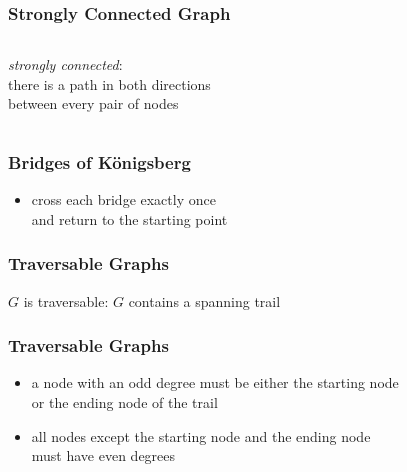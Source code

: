 \documentclass[dvipsnames]{beamer}
\begin{document}
\begin{frame}
  \frametitle{Strongly Connected Graph}

  \begin{columns}
    \begin{definition}
      \emph{strongly connected}:\\
      there is a path in both directions\\
      between every pair of nodes
    \end{definition}

    \begin{example}
      \begin{center}
      \end{center}
    \end{example}
  \end{columns}
\end{frame}

\begin{frame}
  \frametitle{Bridges of Königsberg}

  \begin{center}
  \end{center}

  \begin{itemize}
    \item cross each bridge exactly once\\
      and return to the starting point
  \end{itemize}
\end{frame}

\begin{frame}
  \frametitle{Traversable Graphs}

  \begin{definition}
    $G$ is \alert{traversable}: $G$ contains a spanning trail
  \end{definition}

  \begin{center}
  \end{center}
\end{frame}

\begin{frame}
  \frametitle{Traversable Graphs}

  \begin{itemize}
    \item a node with an odd degree must be either the starting node\\
      or the ending node of the trail
    \item all nodes except the starting node and the ending node\\
      must have even degrees
  \end{itemize}
\end{frame}
\end{document}
